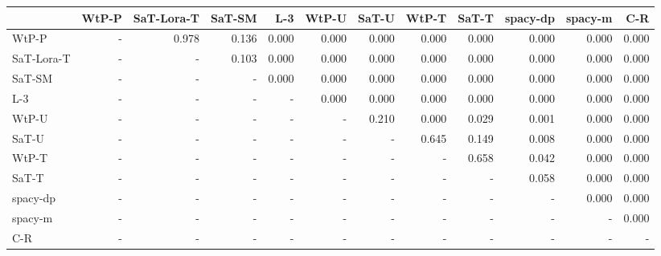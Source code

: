 \begin{tabular}{lrrrrrrrrrrr}
\toprule
 & WtP-P & SaT-Lora-T & SaT-SM & L-3 & WtP-U & SaT-U & WtP-T & SaT-T & spacy-dp & spacy-m & C-R \\
\midrule
WtP-P & - & 0.978 & 0.136 & 0.000 & 0.000 & 0.000 & 0.000 & 0.000 & 0.000 & 0.000 & 0.000 \\
SaT-Lora-T & - & - & 0.103 & 0.000 & 0.000 & 0.000 & 0.000 & 0.000 & 0.000 & 0.000 & 0.000 \\
SaT-SM & - & - & - & 0.000 & 0.000 & 0.000 & 0.000 & 0.000 & 0.000 & 0.000 & 0.000 \\
L-3 & - & - & - & - & 0.000 & 0.000 & 0.000 & 0.000 & 0.000 & 0.000 & 0.000 \\
WtP-U & - & - & - & - & - & 0.210 & 0.000 & 0.029 & 0.001 & 0.000 & 0.000 \\
SaT-U & - & - & - & - & - & - & 0.645 & 0.149 & 0.008 & 0.000 & 0.000 \\
WtP-T & - & - & - & - & - & - & - & 0.658 & 0.042 & 0.000 & 0.000 \\
SaT-T & - & - & - & - & - & - & - & - & 0.058 & 0.000 & 0.000 \\
spacy-dp & - & - & - & - & - & - & - & - & - & 0.000 & 0.000 \\
spacy-m & - & - & - & - & - & - & - & - & - & - & 0.000 \\
C-R & - & - & - & - & - & - & - & - & - & - & - \\
\bottomrule
\end{tabular}


